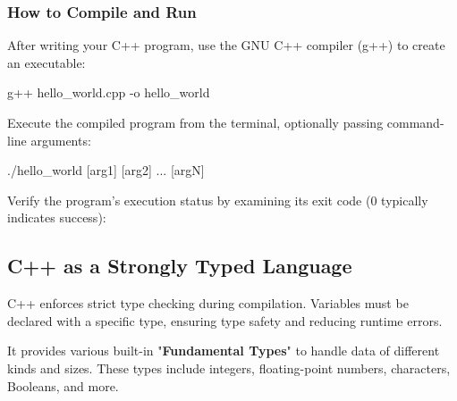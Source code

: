 \subsubsection{How to Compile and Run}

After writing your C++ program, use the GNU C++ compiler (g++) to create an executable:

\vspace{-0.5em}

\begin{codeblock}[language=bash, numbers=none]
g++ hello_world.cpp -o hello_world
\end{codeblock}

\vspace{-0.5em}

Execute the compiled program from the terminal, optionally passing command-line arguments:

\vspace{-0.5em}

\begin{codeblock}[language=bash, numbers=none]
./hello_world [arg1] [arg2] ... [argN]
\end{codeblock}

\vspace{-0.5em}

Verify the program's execution status by examining its exit code (0 typically indicates success):

\vspace{-0.5em}


\subsection{C++ as a Strongly Typed Language}

C++ enforces strict type checking during compilation. Variables must be declared with a specific type, ensuring type safety and reducing runtime errors. 

\vspace{0.5em}

It provides various built-in "\textbf{Fundamental Types}" to handle data of different kinds and sizes. These types include integers, floating-point numbers, characters, Booleans, and more.

